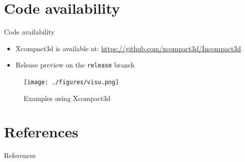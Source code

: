 \documentclass[presentation]{beamer}
\begin{document}
\section{Code availability}
\label{sec:org6f1cd98}

\begin{frame}[label={sec:orgda36814},fragile]{Code availability}
 \begin{itemize}
\item Xcompact3d is available at: \url{https://github.com/xcompact3d/Incompact3d}
\item Release preview on the \texttt{release} branch
\end{itemize}

\begin{figure}[htbp]
\centering
\texttt{[image: ./figures/visu.png]}
\caption{Examples using Xcompact3d}
\end{figure}
\end{frame}

\section{References}
\label{sec:org7ab960d}

\begin{frame}[label={sec:org2c9fd8c}]{References}


\end{frame}
\end{document}
